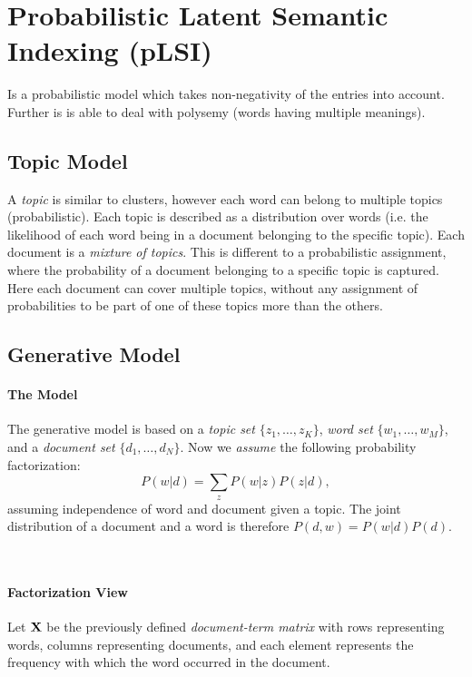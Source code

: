 \section{Probabilistic Latent Semantic Indexing (pLSI)}
Is a probabilistic model which takes non-negativity of the entries into account. Further is is able to deal with polysemy (words having multiple meanings).

\subsection{Topic Model}
A \emph{topic} is similar to clusters, however each word can belong to multiple topics (probabilistic). Each topic is described as a distribution over words (i.e. the likelihood of each word being in a document belonging to the specific topic). Each document is a \emph{mixture of topics}. This is different to a probabilistic assignment, where the probability of a document belonging to a specific topic is captured. Here each document can cover multiple topics, without any assignment of probabilities to be part of one of these topics more than the others.

\subsection{Generative Model}

\paragraph{The Model}
The generative model is based on a \emph{topic set} \(\{z_1, \ldots, z_K\}\), \emph{word set} \(\{w_1, \ldots, w_M\}\), and a \emph{document set} \(\{d_1, \ldots, d_N\}\). Now we \emph{assume} the following probability factorization:
\[
P(w | d) = \sum_z P(w | z) P(z | d),
\] assuming independence of word and document given a topic. The joint distribution of a document and a word is therefore \(P(d, w) = P(w | d) P(d)\).

\\

\paragraph{Factorization View}
Let \(\boldsymbol{\mathrm{X}}\) be the previously defined \emph{document-term matrix} with rows representing words, columns representing documents, and each element represents the frequency with which the word occurred in the document.

